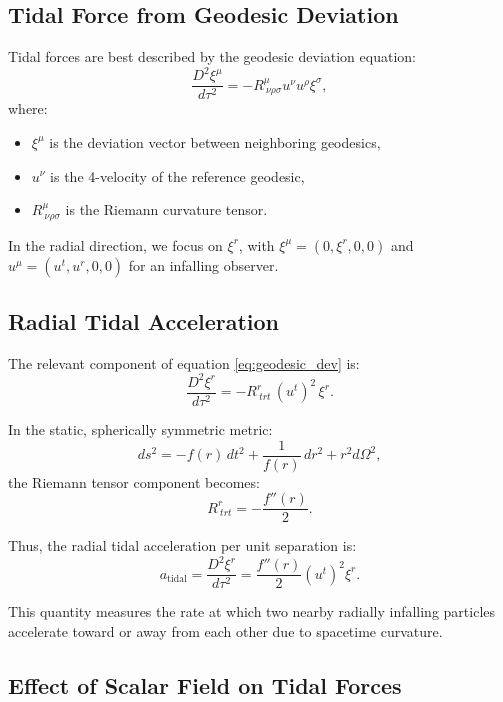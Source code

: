 \documentclass[12pt]{article}
\begin{document}
\subsection{Tidal Force from Geodesic Deviation}

Tidal forces are best described by the geodesic deviation equation:
\begin{equation}
\frac{D^2 \xi^\mu}{d\tau^2} = -R^\mu_{\ \nu\rho\sigma} u^\nu u^\rho \xi^\sigma,
\label{eq:geodesic_dev}
\end{equation}
where:
\begin{itemize}
    \item \( \xi^\mu \) is the deviation vector between neighboring geodesics,
    \item \( u^\nu \) is the 4-velocity of the reference geodesic,
    \item \( R^\mu_{\ \nu\rho\sigma} \) is the Riemann curvature tensor.
\end{itemize}

In the radial direction, we focus on \( \xi^r \), with \( \xi^\mu = (0, \xi^r, 0, 0) \) and \( u^\mu = (u^t, u^r, 0, 0) \) for an infalling observer.

\subsection{Radial Tidal Acceleration}

The relevant component of equation \eqref{eq:geodesic_dev} is:
\begin{equation}
\frac{D^2 \xi^r}{d\tau^2} = -R^r_{\ t r t} \, (u^t)^2 \, \xi^r.
\end{equation}

In the static, spherically symmetric metric:
\[
ds^2 = -f(r)\, dt^2 + \frac{1}{f(r)}\, dr^2 + r^2 d\Omega^2,
\]
the Riemann tensor component becomes:
\begin{equation}
R^r_{\ t r t} = -\frac{f''(r)}{2}.
\end{equation}

Thus, the radial tidal acceleration per unit separation is:
\begin{equation}
a_{\text{tidal}} = \frac{D^2 \xi^r}{d\tau^2} = \frac{f''(r)}{2} (u^t)^2 \xi^r.
\end{equation}

This quantity measures the rate at which two nearby radially infalling particles accelerate toward or away from each other due to spacetime curvature.

\subsection{Effect of Scalar Field on Tidal Forces}
\end{document}
